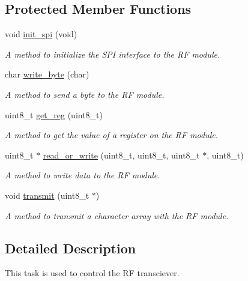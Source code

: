 \subsection*{Protected Member Functions}
\begin{DoxyCompactItemize}
\item 
void \mbox{\hyperlink{classtask__radio_ae65a87dacc155acdc221ca640a6812f8}{init\+\_\+spi}} (void)
\begin{DoxyCompactList}\small\item\em A method to initialize the S\+PI interface to the RF module. \end{DoxyCompactList}\item 
char \mbox{\hyperlink{classtask__radio_ae18b22460053f286ad2327b785cfa018}{write\+\_\+byte}} (char)
\begin{DoxyCompactList}\small\item\em A method to send a byte to the RF module. \end{DoxyCompactList}\item 
uint8\+\_\+t \mbox{\hyperlink{classtask__radio_a864714d4a62ca47b6852272d70aa0a0e}{get\+\_\+reg}} (uint8\+\_\+t)
\begin{DoxyCompactList}\small\item\em A method to get the value of a register on the RF module. \end{DoxyCompactList}\item 
uint8\+\_\+t $\ast$ \mbox{\hyperlink{classtask__radio_a06d1554c99f26f78698d156f8a729ec7}{read\+\_\+or\+\_\+write}} (uint8\+\_\+t, uint8\+\_\+t, uint8\+\_\+t $\ast$, uint8\+\_\+t)
\begin{DoxyCompactList}\small\item\em A method to write data to the RF module. \end{DoxyCompactList}\item 
void \mbox{\hyperlink{classtask__radio_ae86d2810bfbf4174f73b6c975f2deef4}{transmit}} (uint8\+\_\+t $\ast$)
\begin{DoxyCompactList}\small\item\em A method to transmit a character array with the RF module. \end{DoxyCompactList}\end{DoxyCompactItemize}


\subsection{Detailed Description}
This task is used to control the RF transciever. 

